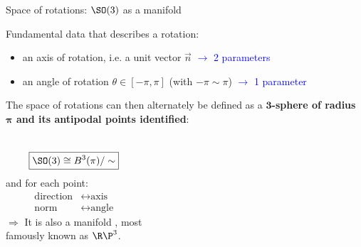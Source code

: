 \documentclass[9pt]{beamer}
\renewcommand{\emph}{\alert}
\begin{document}
\begin{frame}{Space of rotations: $\SO(3)$ as a manifold}

    Fundamental data that describes a rotation:
    \begin{itemize}
        \item an \emph{axis} of rotation, i.e. a  unit vector $\overrightarrow{n}$ \hspace{1.07cm}\textcolor{blue}{$\to$ 2 parameters}
        \item an \emph{angle} of rotation $\theta\in[-\pi,\pi]$ (with $-\pi\sim\pi$) \textcolor{blue}{$\to$ 1 parameter}
    \end{itemize}
    The space of rotations can then alternately be defined as a \textbf{$\boldsymbol{3}$-sphere of radius $\boldsymbol{\pi}$ and its antipodal points identified}:

    \begin{columns}[T,onlytextwidth]

            \vspace{0.5cm}
            \begin{equation*}
              \boxed{\SO(3)\cong B^3(\pi)/\sim}
            \end{equation*}
            and for each point:
            \begin{align*}
                \text{direction} &\leftrightarrow \text{axis}\\
                \text{norm} &\leftrightarrow \text{angle}
            \end{align*}
            $\Rightarrow$ It is also a \emph{manifold} , most \\
            \hspace{0.3cm} famously known as $\R\P^3$.
  
  

\end{columns}
\end{frame}
\end{document}
